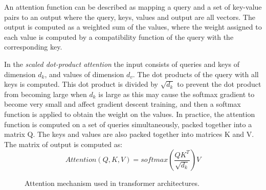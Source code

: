 \hfill \break

An attention function can be described as mapping a query and a set of key-value pairs to an output where the query, keys, values and output are all vectors. The output is computed as a weighted sum of the values, where the weight assigned to each value is computed by a compatibility function of the query with the corresponding key. 

\hfill \break

In the \textit{scaled dot-product attention} the input consists of queries and keys of dimension $d_k$, and values of dimension $d_v$. The dot products of the query with all keys is computed. This dot product is divided by $\sqrt{d_k}$ to prevent the dot product from becoming large when $d_k$ is large as this may cause the softmax gradient to become very small and affect gradient descent training, and then a softmax function is applied to obtain the weight on the values. In practice, the attention function is computed on a set of queries simultaneously, packed together into a matrix Q. The keys and values are also packed together into matrices K and V. The matrix of output is computed as:
$$Attention(Q,K,V)=softmax\left( \frac{QK^T}{\sqrt{d_k}} \right )V$$

\hfill \break

\begin{figure}[h]
    \centering
    \qquad
    \caption[Fixed allocation anomaly]{Attention mechanism used in transformer architectures.}%
    \label{fig:attention_mechanisms}%
\end{figure}


